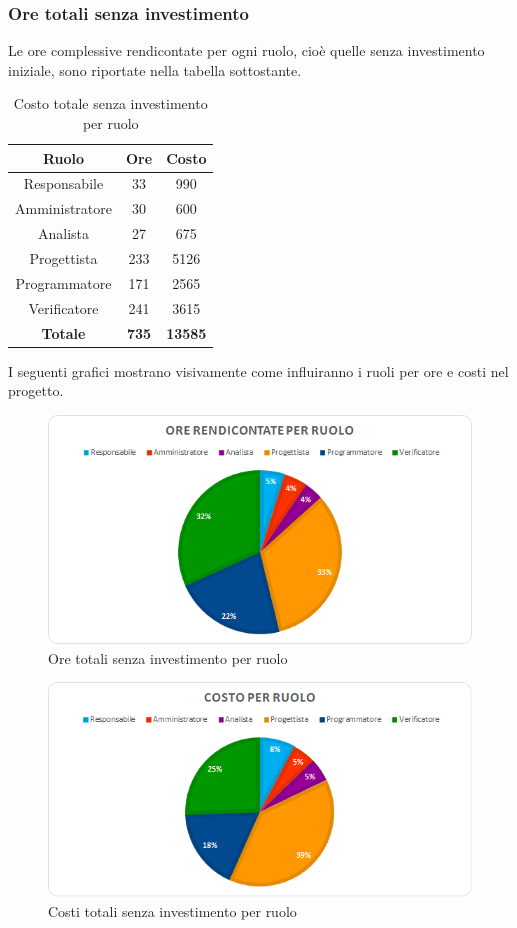 \subsubsection{Ore totali senza investimento}
Le ore complessive rendicontate per ogni ruolo, cioè quelle senza investimento iniziale, sono riportate nella tabella sottostante.
\begin{table}[H]
	\centering
	\begin{tabular}{|c|c|c|}
		\hline
		\textbf{Ruolo} &
		\textbf{Ore} &
		\textbf{Costo} \\
		\hline
		Responsabile & 33 & 990\\
		\hline
		Amministratore & 30 & 600\\
		\hline
		Analista & 27 & 675\\
		\hline
		Progettista & 233 & 5126 \\
		\hline
		Programmatore & 171 & 2565 \\
		\hline
		Verificatore & 241 & 3615\\
		\hline
		\textbf{Totale} & \textbf{735} & \textbf{13585} \\
		\hline
	\end{tabular}
	\caption{Costo totale senza investimento per ruolo}
\end{table}
I seguenti grafici mostrano visivamente come influiranno i ruoli per ore e costi nel progetto.
\begin{figure}[H]
	\centering
	\includegraphics[width=14cm]{img_peconomico/TOT2_OR_R.png}
	\caption{Ore totali senza investimento per ruolo}
\end{figure}
\begin{figure}[H]
	\centering
	\includegraphics[width=14cm]{img_peconomico/TOT2_CR_R.png}
	\caption{Costi totali senza investimento per ruolo}
\end{figure}





